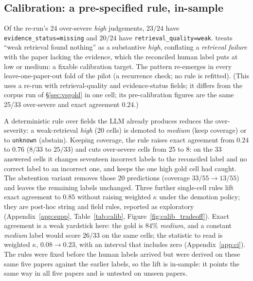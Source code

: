 \subsection{Calibration: a pre-specified rule, in-sample}
\label{sec:calib}

Of the re-run's 24 over-severe \emph{high} judgements, $23/24$ have
\texttt{evidence\_status=missing} and $20/24$ have
\texttt{retrieval\_quality=weak}. \sys{} treats ``weak retrieval found nothing''
as a substantive \emph{high}, conflating a \emph{retrieval failure} with the paper
lacking the evidence, which the reconciled human label puts at low or medium: a fixable
calibration target. The pattern re-emerges in every leave-one-paper-out fold
of the pilot (a recurrence check; no rule is refitted). (This uses a
re-run with retrieval-quality and evidence-status fields; it
differs from the corpus run of \S\ref{sec:vsgold}
in one cell; its pre-calibration figures are the same 25/33 over-severe and
exact agreement $0.24$.)

A deterministic rule over fields the LLM already produces reduces the
over-severity: a weak-retrieval \emph{high} (20 cells) is demoted to
\emph{medium} (keep coverage) or to \texttt{unknown} (abstain). Keeping
coverage, the rule raises exact agreement from $0.24$ to $0.76$ ($8/33$ to
$25/33$) and cuts over-severe cells from 25 to 8: on the 33 answered cells it
changes seventeen incorrect labels to the reconciled label and no correct
label to an incorrect one, and keeps the one high gold cell \sys{} had caught.
The abstention variant removes those 20 predictions (coverage $33/55 \to
13/55$) and leaves the remaining labels unchanged. Three further single-cell
rules lift exact agreement to $0.85$ without raising weighted $\kappa$ under
the demotion policy; they are post-hoc string and field rules, reported as
exploratory
(Appendix~\ref{app:supp}, Table~\ref{tab:calib},
Figure~\ref{fig:calib_tradeoff}). Exact agreement is a weak yardstick here: the gold is
$84\%$ \emph{medium}, and a constant \emph{medium} label would score $26/33$ on
the same cells; the statistic to read is weighted
$\kappa$, $0.08 \to 0.23$, with an interval that includes zero
(Appendix~\ref{app:ci}). The rules were fixed before the human labels arrived
but were derived on these same five papers against the earlier labels, so the
lift is in-sample: it points the same way in all five papers and is untested on
unseen papers.


